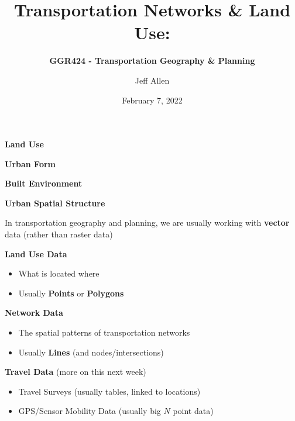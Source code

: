 \documentclass[aspectratio=169]{beamer}
\title{\textbf{Transportation Networks \& Land Use:}}
\subtitle{\textbf{GGR424 - Transportation Geography \& Planning}}
\author{Jeff Allen}
\institute{University of Toronto}
\date{February 7, 2022}
\begin{document}
	
\begin{frame}
	\titlepage	
\end{frame}



\begin{frame}
	
	\textbf{Land Use}
	
	\textbf{Urban Form}
	
	\textbf{Built Environment}
	
	\textbf{Urban Spatial Structure}
	
\end{frame}





\begin{frame}
	
	In transportation geography and planning, we are usually working with \textbf{vector} data (rather than raster data)
	
	\vspace{2mm}
	
	\textbf{Land Use Data}
	
	\begin{itemize}
		\item What is located where
		\item Usually \textbf{Points} or \textbf{Polygons}
	\end{itemize}

	\vspace{2mm}
	
	\textbf{Network Data}
	
	\begin{itemize}
		\item The spatial patterns of transportation networks 
		\item Usually \textbf{Lines} (and nodes/intersections)
	\end{itemize}

	\vspace{2mm}

	\textbf{Travel Data} (more on this next week)
	
	\begin{itemize}
		
		\item Travel Surveys (usually tables, linked to locations)
		\item GPS/Sensor Mobility Data (usually big $N$ point data)

	\end{itemize}
		
\end{frame}
\end{document}

